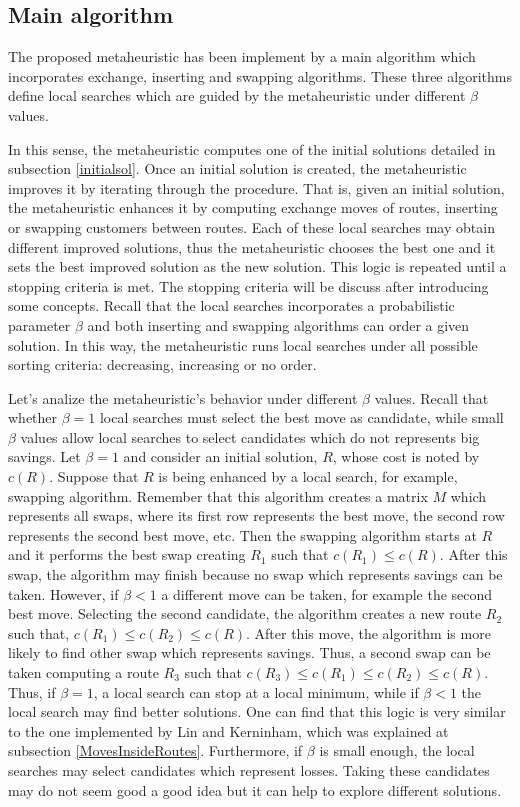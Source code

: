 \subsection{Main algorithm}\label{Mainalgorithm}

The proposed metaheuristic has been implement by a main algorithm which incorporates exchange, inserting and swapping algorithms. These three algorithms define local searches which are guided by the metaheuristic under different $\beta$ values.

In this sense, the metaheuristic computes one of the initial solutions detailed in subsection \ref{initialsol}. Once an initial solution is created, the metaheuristic improves it by iterating through the procedure. That is, given an initial solution, the metaheuristic enhances it by computing exchange moves of routes, inserting or swapping customers between routes. Each of these local searches may obtain different improved solutions, thus the metaheuristic chooses the best one and it sets the best improved solution as the new solution. This logic is repeated until a stopping criteria is met. The stopping criteria will be discuss after introducing some concepts. Recall that the local searches incorporates a probabilistic parameter $\beta$ and both inserting and swapping algorithms can order a given solution. In this way, the metaheuristic runs local searches under all possible sorting criteria: decreasing, increasing or no order. 

Let's analize the metaheuristic's behavior under different $\beta$ values. Recall that whether $\beta=1$ local searches must select the best move as candidate, while small $\beta$ values allow local searches to select candidates which do not represents big savings. Let $\beta=1$ and consider an initial solution, $R$, whose cost is noted by $c(R)$. Suppose that $R$ is being enhanced by a local search, for example, swapping algorithm. Remember that this algorithm creates a matrix $M$ which represents all swaps, where its first row represents the best move, the second row represents the second best move, etc. Then the swapping algorithm starts at $R$ and it performs the best swap creating $R_{1}$ such that $c(R_{1}) \leq c(R)$. After this swap, the algorithm may finish because no swap which represents savings can be taken. However, if $\beta<1$ a different move can be taken, for example the second best move. Selecting the second candidate, the algorithm creates a new route $R_{2}$ such that, $c(R_{1}) \leq c(R_{2}) \leq c(R)$. After this move, the algorithm is more likely to find other swap which represents savings. Thus, a second swap can be taken computing a route $R_{3}$ such that $c(R_{3})\leq c(R_{1}) \leq c(R_{2}) \leq c(R)$. Thus, if $\beta = 1$, a local search can stop at a local minimum, while if $\beta <1$ the local search may find better solutions. One can find that this logic is very similar to the one implemented by Lin and Kerninham, which was explained at subsection \ref{MovesInsideRoutes}. Furthermore, if $\beta$ is small enough, the local searches may select candidates which represent losses. Taking these candidates may do not seem good a good idea but it can help to explore different solutions.

